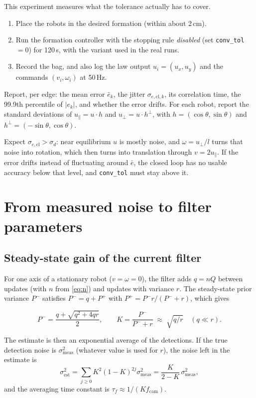 \documentclass[11pt,a4paper]{article}
\begin{document}
This experiment measures what the tolerance actually has to cover.
\begin{enumerate}[leftmargin=*]
\item Place the robots in the desired formation (within about 2\,cm).
\item Run the formation controller with the stopping rule \emph{disabled}
      (set \texttt{conv\_tol}$=0$) for 120\,s, with the variant used in
      the real runs.
\item Record the bag, and also log the law output $u_i=(u_x,u_y)$ and
      the commands $(v_i,\omega_i)$ at 50\,Hz.
\end{enumerate}
Report, per edge: the mean error $\bar e_k$, the jitter $\sigma_{e,\text{cl},k}$,
its correlation time, the 99.9th percentile of $|e_k|$, and whether the
error drifts. For each robot, report the standard deviations of
$u_\parallel=u\cdot h$ and $u_\perp=u\cdot h^\perp$, with
$h=(\cos\theta,\sin\theta)$ and $h^\perp=(-\sin\theta,\cos\theta)$.

Expect $\sigma_{e,\text{cl}}>\sigma_d$: near equilibrium $u$ is mostly
noise, and $\omega=u_\perp/l$ turns that noise into rotation, which
then turns into translation through $v=2u_\parallel$. If the error
drifts instead of fluctuating around $\bar e$, the closed loop has no
usable accuracy below that level, and \texttt{conv\_tol} must stay above
it.

\section{From measured noise to filter parameters}
\label{sec:tuning}

\subsection{Steady-state gain of the current filter}
For one axis of a stationary robot ($v=\omega=0$), the filter adds $q=nQ$
between updates (with $n$ from \eqref{eq:n}) and updates with variance
$r$. The steady-state prior variance $P^-$ satisfies
$P^- = q + P^+$ with $P^+ = P^-r/(P^-+r)$, which gives
\begin{mathbox}
\begin{equation}
  P^-=\frac{q+\sqrt{q^2+4qr}}{2},\qquad
  K=\frac{P^-}{P^-+r}\;\approx\;\sqrt{q/r}\quad(q\ll r).
  \label{eq:K}
\end{equation}
\end{mathbox}
The estimate is then an exponential average of the detections. If the
true detection noise is $\sigma_\text{meas}^2$ (whatever value is used for
$r$), the noise left in the estimate is
\begin{equation}
  \sigma_\text{est}^2=\sum_{j\ge0}K^2(1-K)^{2j}\sigma^2_\text{meas}=\frac{K}{2-K}\,\sigma^2_\text{meas},
  \label{eq:sest}
\end{equation}
and the averaging time constant is $\tau_f\approx 1/(K f_\text{cam})$.
\end{document}
